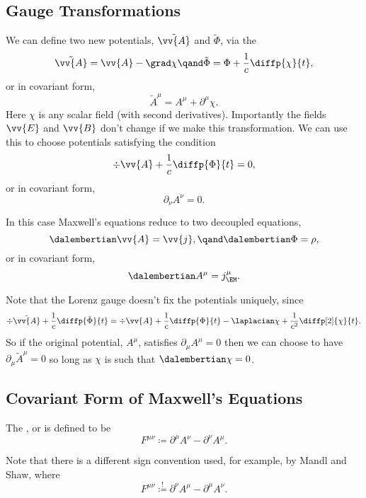 \subsection{Gauge Transformations}
We can define two new potentials, \(\tilde{\vv{A}}\) and \(\tilde{\Phi}\), via the 
\begin{equation}
    \tilde{\vv{A}} = \vv{A} - \grad\chi \qand \tilde{\Phi} = \Phi + \frac{1}{c}\diffp{\chi}{t},
\end{equation}
or in covariant form,
\begin{equation}
    \tilde{A}^\mu = A^\mu + \partial^\mu \chi.
\end{equation}
Here \(\chi\) is any scalar field (with second derivatives).
Importantly the fields \(\vv{E}\) and \(\vv{B}\) don't change if we make this transformation.
We can use this to choose potentials satisfying the  condition
\begin{equation}
    \div \vv{A} + \frac{1}{c}\diffp{\Phi}{t} = 0,
\end{equation}
or in covariant form,
\begin{equation}
    \partial_\nu A^\nu = 0.
\end{equation}

In this case Maxwell's equations reduce to two decoupled equations,
\begin{equation}
    \dalembertian \vv{A} = \vv{j}, \qand \dalembertian\Phi = \rho,
\end{equation}
or in covariant form,
\begin{equation}
    \dalembertian A^\mu = j_{\EM}^{\mu}.
\end{equation}

Note that the Lorenz gauge doesn't fix the potentials uniquely, since
\begin{equation}
    \div\tilde{\vv{A}} + \frac{1}{c}\diffp{\tilde{\Phi}}{t} = \div\vv{A} + \frac{1}{c}\diffp{\Phi}{t} - \laplacian \chi + \frac{1}{c^2} \diffp[2]{\chi}{t}.
\end{equation}
So if the original potential, \(A^\mu\), satisfies \(\partial_\mu A^\mu = 0\) then we can choose to have \(\partial_\mu \tilde{A}^\mu = 0\) so long as \(\chi\) is such that \(\dalembertian\chi = 0\).

\subsection{Covariant Form of Maxwell's Equations}
The , or  is defined to be
\begin{equation}
    F^{\mu\nu} \coloneqq \partial^\mu A^\nu - \partial^\nu A^\mu.
\end{equation}
\begin{wrn}
    Note that there is a different sign convention used, for example, by Mandl and Shaw, where
    \begin{equation}
        F^{\mu\nu} \stackrel{!}{\coloneqq} \partial^\nu A^\mu - \partial^\mu A^\nu.
    \end{equation}
\end{wrn}

